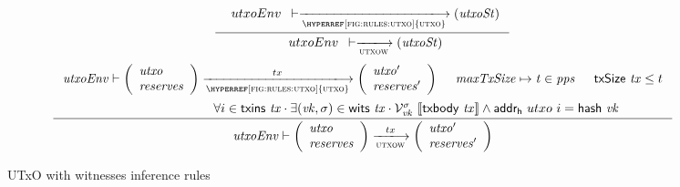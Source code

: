 \begin{figure}
  \begin{equation}\label{eq:utxow-bootstrap}
    \inference
    {
      {\begin{array}{l}
         utxoEnv
      \end{array}}
      \vdash
      \trans{\hyperref[fig:rules:utxo]{utxo}}{}
      \left(
        \var{utxoSt}
      \right)
    }
    {
      {\begin{array}{l}
         utxoEnv
      \end{array}}
      \vdash
      \trans{utxow}{}
      \left(
        \var{utxoSt}
      \right)
    }
  \end{equation}
  \nextdef
  \begin{equation}
    \label{eq:utxo-witness-inductive}
    \inference
    { \var{utxoEnv}
      \vdash
      {\left(
        \begin{array}{l}
          \var{utxo}\\
          \var{reserves}
        \end{array}
      \right)}
      \trans{\hyperref[fig:rules:utxo]{utxo}}{tx}
      {\left(
        \begin{array}{l}
          \var{utxo'}\\
          \var{reserves'}
        \end{array}
      \right)}
      & \var{maxTxSize} \mapsto \var{t} \in \var{pps} & \fun{txSize}~\var{tx} \leq t \\ ~ \\
      & \forall i \in \txins{tx} \cdot \exists (\var{vk}, \sigma) \in \wits{\var{tx}}
      \cdot
      \mathcal{V}^\sigma_{\var{vk}}~{\serialised{\txbody{tx}}}
      \wedge  \fun{addr_h}~{utxo}~i = \hash{vk}\\
    }
    {\var{utxoEnv} \vdash
      \left(
        \begin{array}{l}
          \var{utxo}\\
          \var{reserves}
        \end{array}
      \right)
      \trans{utxow}{tx}
      \left(
        \begin{array}{l}
          \var{utxo'}\\
          \var{reserves'}
        \end{array}
      \right)
    }
  \end{equation}
  \caption{UTxO with witnesses inference rules}
  \label{fig:rules:utxow}
\end{figure}

\clearpage

